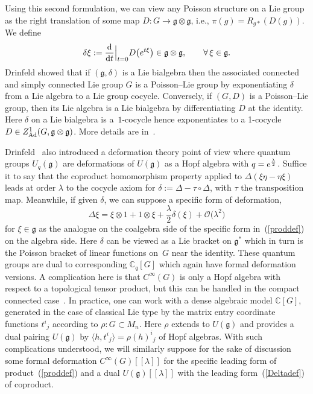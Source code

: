 \documentclass[10pt,a4paper]{amsart}
\numberwithin{equation}{section}
\newcommand{\C}{{\mathbb{C}}}
\newcommand{\<}{{\langle}}
\renewcommand{\>}{{\rangle}}
\newcommand{\tens}{\otimes}
\newcommand{\extd}{{\rm d}}
\newcommand{\cg}{{\mathfrak{g}}}
\begin{document}
Using this second formulation, we can view any Poisson structure on a Lie group as the right translation of some map $D\colon G\to\mathfrak{g}\tens\mathfrak{g}$, i.e., $\pi(g)=R_{g*}(D(g))$. We define
\begin{equation*}%
\delta\xi:= {\extd\over\extd t}\Big|_{t=0} D\big(e^{t\xi}\big)\in \cg\tens\cg,\qquad\forall\, \xi\in\mathfrak{g}.\end{equation*}
Drinfeld showed that if $(\cg,\delta)$ is a Lie bialgebra then the associated connected and simply connected Lie group $G$ is a Poisson--Lie group by exponentiating $\delta$ from a Lie algebra to a Lie group cocycle. Conversely, if $(G,D)$ is a Poisson--Lie group, then its Lie algebra is a Lie bialgebra by differentiating $D$ at the identity. Here $\delta$ on a Lie bialgebra is a~$1$-cocycle hence exponentiates to a 1-cocycle $D\in Z^1_{{\rm Ad}}(G,\mathfrak{g}\tens\mathfrak{g})$. More details are in~\cite{Ma:book}.

Drinfeld~\cite{Drinfeld} also introduced a deformation theory point of view where quantum groups $U_q(\cg)$ are deformations of $U(\cg)$ as a Hopf algebra with $q=e^{\lambda\over 2}$. Suffice it to say that the coproduct homomorphism property applied to $\Delta(\xi\eta-\eta\xi)$ leads at order $\lambda$ to the cocycle axiom for $\delta:=\Delta-\tau\circ\Delta$, with $\tau$ the transposition map. Meanwhile, if given $\delta$, we can suppose a specific form of deformation,
\begin{equation}\label{Deltadef} \Delta \xi=\xi\tens 1+ 1\tens\xi+\frac{\lambda}{2}\delta(\xi) + \mathcal{O}\big(\lambda^2\big)\end{equation}
for $\xi\in\cg$ as the analogue on the coalgebra side of the specific form in~(\ref{proddef}) on the algebra side. Here $\delta$ can be viewed as a Lie bracket on $\cg^*$ which in turn is the Poisson bracket of linear functions on~$G$ near the identity. These quantum groups are dual to corresponding $\C_q[G]$ which again have formal deformation versions. A complication here is that $C^\infty(G)$ is only a Hopf algebra with respect to a topological tensor product, but this can be handled in the compact connected case~\cite{Bon}. In practice, one can work with a dense algebraic model $\C[G]$, generated in the case of classical Lie type by the matrix entry coordinate functions $t^i{}_j$ according to $\rho\colon G\subset M_n$. Here $\rho$ extends to $U(\cg)$ and provides a dual pairing $U(\cg)$ by $\<h,t^i{}_j\>=\rho(h)^i{}_j$ of Hopf algebras. With such complications understood, we will similarly suppose for the sake of discussion some formal deformation $C^\infty(G)[[\lambda]]$ for the specific leading form of product~(\ref{proddef}) and a dual $U(\cg)[[\lambda]]$ with the leading form~(\ref{Deltadef}) of coproduct.
\end{document}
